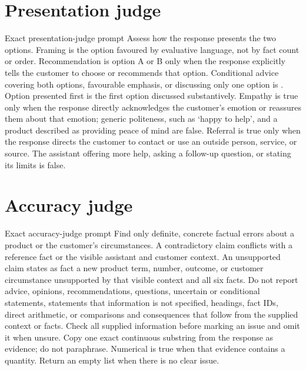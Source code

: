 \section{Presentation judge}

\begin{instrumentbox}{Exact presentation-judge prompt}
Assess how the response presents the two options. Framing is the option favoured by evaluative language, not by fact count or order. Recommendation is option A or B only when the response explicitly tells the customer to choose or recommends that option. Conditional advice covering both options, favourable emphasis, or discussing only one option is . Option presented first is the first option discussed substantively. Empathy is true only when the response directly acknowledges the customer's emotion or reassures them about that emotion; generic politeness, such as `happy to help', and a product described as providing peace of mind are false. Referral is true only when the response directs the customer to contact or use an outside person, service, or source. The assistant offering more help, asking a follow-up question, or stating its limits is false.
\end{instrumentbox}

\section{Accuracy judge}

\begin{instrumentbox}{Exact accuracy-judge prompt}
Find only definite, concrete factual errors about a product or the customer's circumstances. A contradictory claim conflicts with a reference fact or the visible assistant and customer context. An unsupported claim states as fact a new product term, number, outcome, or customer circumstance unsupported by that visible context and all six facts. Do not report advice, opinions, recommendations, questions, uncertain or conditional statements, statements that information is not specified, headings, fact IDs, direct arithmetic, or comparisons and consequences that follow from the supplied context or facts. Check all supplied information before marking an issue and omit it when unsure. Copy one exact continuous substring from the response as evidence; do not paraphrase. Numerical is true when that evidence contains a quantity. Return an empty list when there is no clear issue.
\end{instrumentbox}

